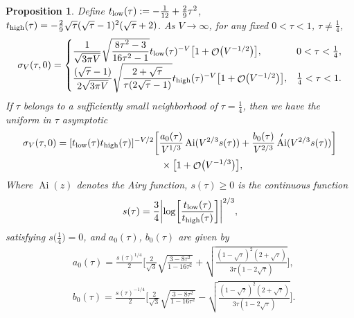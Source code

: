\documentclass[pdftex]{sigma}
\DeclareMathOperator{\OO}{\mathcal{O}}
\DeclareMathOperator{\Ai}{Ai}
\numberwithin{equation}{section}
\newtheorem{Proposition}[Theorem]{Proposition}
 { \theoremstyle{definition}
\newtheorem{Definition}[Theorem]{Definition}
\newtheorem{Note}[Theorem]{Note}
\newtheorem{Example}[Theorem]{Example}
\newtheorem{Remark}[Theorem]{Remark} }
\begin{document}
\begin{Proposition} Define $t_{{\rm low}}(\tau) := -\frac{1}{12}+\frac{2}{9}\tau^2$,
$t_{{\rm high}}(\tau) = -\frac{2}{9} \sqrt{\tau}(\sqrt{\tau} - 1)^2(\sqrt{\tau} +2)$.
As $V\to \infty$, for any fixed $0 < \tau < 1$, $\tau \neq \frac{1}{4}$,
 \begin{equation}\label{sigma-asymptotics-nofield}
 \sigma_V(\tau,0) =
 \begin{cases}
 \dfrac{1}{\sqrt{3\pi V}}\sqrt{\dfrac{8\tau^2-3}{16\tau^2-1}} t_{{\rm low}}(\tau)^{-V}\bigl[1 + \OO\bigl(V^{-1/2}\bigr)\bigr], & 0 < \tau < \frac{1}{4},\\[1.5mm]
 \dfrac{(\sqrt{\tau}-1)}{2\sqrt{3\pi V}}\sqrt{\dfrac{2+\sqrt{\tau}}{\tau (2\sqrt{\tau}-1)}}t_{{\rm high}}(\tau)^{-V}\bigl[1 + \OO\bigl(V^{-1/2}\bigr)\bigr], & \frac{1}{4} < \tau < 1.
 \end{cases}
 \end{equation}
If $\tau$ belongs to a sufficiently small neighborhood of $\tau = \frac{1}{4}$, then we have the \textit{uniform in $\tau$} asymptotic
 \begin{gather*}
 \sigma_V(\tau,0) = [t_{{\rm low}}(\tau)t_{{\rm high}}(\tau)]^{-V/2}\biggl[\frac{a_0(\tau)}{V^{1/3}}\Ai(V^{2/3}s(\tau)) + \frac{b_0(\tau)}{V^{2/3}}\Ai'(V^{2/3}s(\tau))\biggr]\\
 \hphantom{\sigma_V(\tau,0) =}{}
 \times \bigl[1 + \OO\bigl(V^{-1/3}\bigr)\bigr],
 \end{gather*}
Where $\Ai(z)$ denotes the Airy function, $s(\tau) \geq 0$ is the continuous function
 \begin{equation}\label{s-definition}
 s(\tau) = \frac{3}{4}\biggl|\log\biggl[\frac{t_{{\rm low}}(\tau)}{t_{{\rm high}}(\tau)}\biggr]\biggr|^{2/3},
 \end{equation}
satisfying $s\bigl(\frac{1}{4}\bigr) = 0$, and $a_0(\tau)$, $b_0(\tau)$ are given by
 \begin{align*}
 &a_0(\tau)=\frac{s(\tau)^{1/4}}{2}\Biggl[\frac{2}{\sqrt{3}}\sqrt{\frac{3-8\tau^2}{1-16\tau^2}} + \sqrt{\frac{(1-\sqrt{\tau})^2(2+\sqrt{\tau})}{3\tau(1-2\sqrt{\tau})}}\Biggr],\\
 &b_0(\tau)=\frac{s(\tau)^{-1/4}}{2}\Biggl[\frac{2}{\sqrt{3}}\sqrt{\frac{3-8\tau^2}{1-16\tau^2}} - \sqrt{\frac{(1-\sqrt{\tau})^2(2+\sqrt{\tau})}{3\tau(1-2\sqrt{\tau})}}\Biggr].
 \end{align*}
\end{Proposition}
\end{document}
